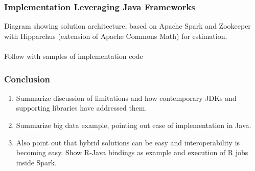 \documentclass[14pt,mathserif]{beamer}
\begin{document}
\begin{frame}
  \frametitle{Implementation Leveraging Java Frameworks}
Diagram showing solution architecture, based on Apache Spark and Zookeeper with Hipparchus (extension of Apache Commons Math) for estimation.
\\
\\
Follow with samples of implementation code
\end{frame}

\begin{frame}
  \frametitle{Conclusion}
\begin{enumerate}
\item Summarize discussion of limitations and how contemporary JDKs and supporting libraries have addressed them.
\item Summarize big data example, pointing out ease of implementation in Java.  
\item Also point out that hybrid solutions can be easy and interoperability is becoming easy.  Show R-Java bindings as example and execution of R jobs inside Spark.
\end{enumerate}
\end{frame}
\end{document}

